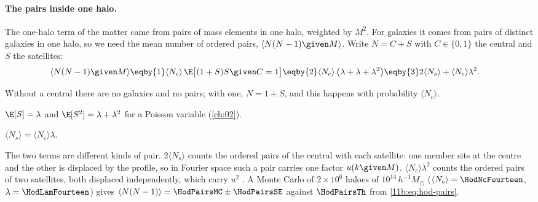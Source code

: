 \paragraph{The pairs inside one halo.}
The one-halo term of the matter came from pairs of mass elements in one halo,
weighted by $M^2$. For galaxies it comes from pairs of distinct galaxies in one
halo, so we need the mean number of ordered pairs, $\langle N(N-1)\given M\rangle$.
Write $N=C+S$ with $C\in\{0,1\}$ the central and $S$ the satellites:
\begin{align}
  \langle N(N-1)\given M\rangle
  &\eqby{1}\langle N_c\rangle\,\E\bigl[(1+S)S\given C=1\bigr]
   \eqby{2}\langle N_c\rangle\,\bigl(\lambda+\lambda+\lambda^2\bigr)
   \eqby{3}2\langle N_s\rangle+\langle N_c\rangle\lambda^2 .
  \label{11b:eq:hod-pairs}
\end{align}
\begin{explain}
  \item Without a central there are no galaxies and no pairs; with one,
        $N=1+S$, and this happens with probability $\langle N_c\rangle$.
  \item $\E[S]=\lambda$ and $\E[S^2]=\lambda+\lambda^2$ for a Poisson
        variable (\cref{ch:02}).
  \item $\langle N_s\rangle=\langle N_c\rangle\lambda$.
\end{explain}
The two terms are different kinds of pair. $2\langle N_s\rangle$ counts the
ordered pairs of the central with each satellite: one member sits at the centre
and the other is displaced by the profile, so in Fourier space such a pair carries
one factor $u(k\given M)$. $\langle N_c\rangle\lambda^2$ counts the ordered pairs
of two satellites, both displaced independently, which carry $u^2$
. A Monte Carlo of $2\times10^6$ haloes of
$10^{14}\,h^{-1}M_\odot$ ($\langle N_c\rangle=\HodNcFourteen$,
$\lambda=\HodLamFourteen$) gives $\langle N(N-1)\rangle=\HodPairsMC\pm\HodPairsSE$
against $\HodPairsTh$ from \eqref{11b:eq:hod-pairs}.

